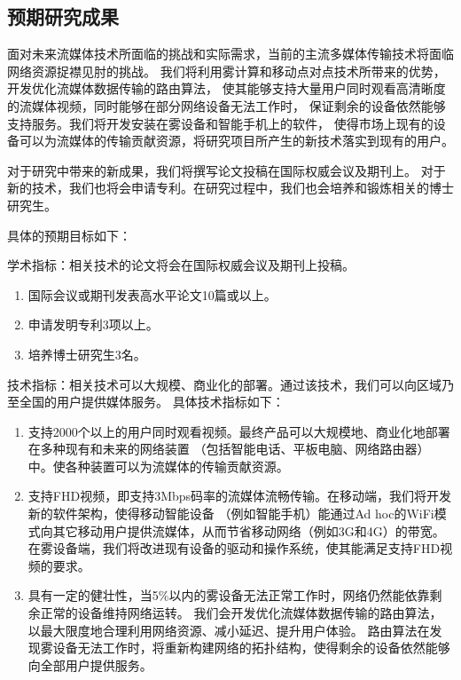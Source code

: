 \subsection{预期研究成果}

面对未来流媒体技术所面临的挑战和实际需求，当前的主流多媒体传输技术将面临网络资源捉襟见肘的挑战。
我们将利用雾计算和移动点对点技术所带来的优势，开发优化流媒体数据传输的路由算法，
使其能够支持大量用户同时观看高清晰度的流媒体视频，同时能够在部分网络设备无法工作时，
保证剩余的设备依然能够支持服务。我们将开发安装在雾设备和智能手机上的软件，
使得市场上现有的设备可以为流媒体的传输贡献资源，将研究项目所产生的新技术落实到现有的用户。

对于研究中带来的新成果，我们将撰写论文投稿在国际权威会议及期刊上。
对于新的技术，我们也将会申请专利。在研究过程中，我们也会培养和锻炼相关的博士研究生。

具体的预期目标如下：

学术指标：相关技术的论文将会在国际权威会议及期刊上投稿。
\begin{enumerate}
\item 国际会议或期刊发表高水平论文10篇或以上。
\item 申请发明专利3项以上。
\item 培养博士研究生3名。
\end{enumerate}

技术指标：相关技术可以大规模、商业化的部署。通过该技术，我们可以向区域乃至全国的用户提供媒体服务。
具体技术指标如下：
\begin{enumerate}
\item 支持2000个以上的用户同时观看视频。最终产品可以大规模地、商业化地部署在多种现有和未来的网络装置
（包括智能电话、平板电脑、网络路由器）中。使各种装置可以为流媒体的传输贡献资源。
\item 支持FHD视频，即支持3Mbps码率的流媒体流畅传输。在移动端，我们将开发新的软件架构，使得移动智能设备
（例如智能手机）能通过Ad hoc的WiFi模式向其它移动用户提供流媒体，从而节省移动网络（例如3G和4G）的带宽。
在雾设备端，我们将改进现有设备的驱动和操作系统，使其能满足支持FHD视频的要求。
\item 具有一定的健壮性，当5\%以内的雾设备无法正常工作时，网络仍然能依靠剩余正常的设备维持网络运转。
我们会开发优化流媒体数据传输的路由算法，以最大限度地合理利用网络资源、减小延迟、提升用户体验。
路由算法在发现雾设备无法工作时，将重新构建网络的拓扑结构，使得剩余的设备依然能够向全部用户提供服务。
\end{enumerate}
